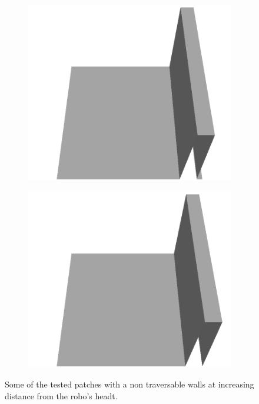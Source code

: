 \begin{figure}[htbp]
\begin{subfigure}[b]{0.24\linewidth}
    \includegraphics[width=\linewidth]{../img/5/custom_patches/walls_front/all/21-3d.png}
    \end{subfigure}
    \begin{subfigure}[b]{0.24\linewidth}
    \includegraphics[width=\linewidth]{../img/5/custom_patches/walls_front/all/24-3d.png}
    \end{subfigure}
    \caption{Some of the tested patches with a non traversable walls at increasing distance from the robo's headt.}
    \label{fig : walls-distance}
    \end{figure}
